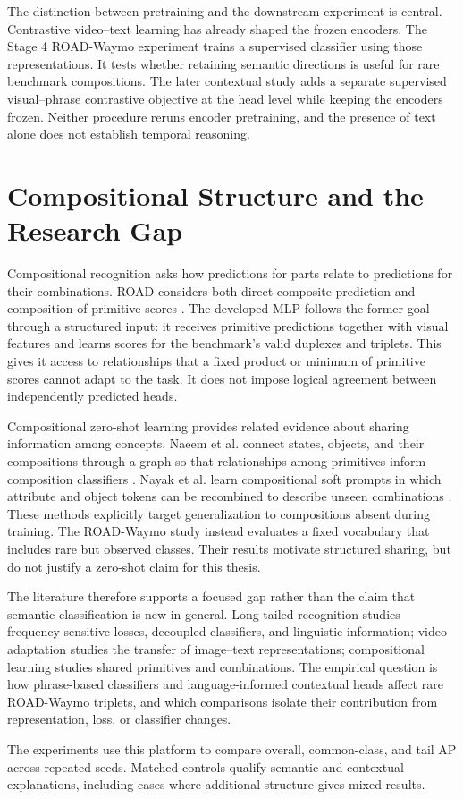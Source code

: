 The distinction between pretraining and the downstream experiment is central. Contrastive video--text learning has already shaped the frozen encoders. The Stage 4 ROAD-Waymo experiment trains a supervised classifier using those representations. It tests whether retaining semantic directions is useful for rare benchmark compositions. The later contextual study adds a separate supervised visual--phrase contrastive objective at the head level while keeping the encoders frozen. Neither procedure reruns encoder pretraining, and the presence of text alone does not establish temporal reasoning.

\section{Compositional Structure and the Research Gap}

Compositional recognition asks how predictions for parts relate to predictions for their combinations. ROAD considers both direct composite prediction and composition of primitive scores \cite{road}. The developed MLP follows the former goal through a structured input: it receives primitive predictions together with visual features and learns scores for the benchmark's valid duplexes and triplets. This gives it access to relationships that a fixed product or minimum of primitive scores cannot adapt to the task. It does not impose logical agreement between independently predicted heads.

Compositional zero-shot learning provides related evidence about sharing information among concepts. Naeem et al. connect states, objects, and their compositions through a graph so that relationships among primitives inform composition classifiers \cite{cge}. Nayak et al. learn compositional soft prompts in which attribute and object tokens can be recombined to describe unseen combinations \cite{csp}. These methods explicitly target generalization to compositions absent during training. The ROAD-Waymo study instead evaluates a fixed vocabulary that includes rare but observed classes. Their results motivate structured sharing, but do not justify a zero-shot claim for this thesis.

The literature therefore supports a focused gap rather than the claim that semantic classification is new in general. Long-tailed recognition studies frequency-sensitive losses, decoupled classifiers, and linguistic information; video adaptation studies the transfer of image--text representations; compositional learning studies shared primitives and combinations. The empirical question is how phrase-based classifiers and language-informed contextual heads affect rare ROAD-Waymo triplets, and which comparisons isolate their contribution from representation, loss, or classifier changes.

The experiments use this platform to compare overall, common-class, and tail AP across repeated seeds. Matched controls qualify semantic and contextual explanations, including cases where additional structure gives mixed results.
